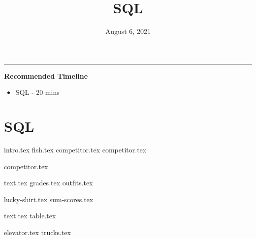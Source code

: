 \documentclass{exam}
\title{\textsc{SQL}}
\date{August 6, 2021}
\begin{document}
\maketitle\rule{\textwidth}{0.15em}
\fontsize{12}{15}\selectfont

\begin{blocksection}
\begin{guide}
\textbf{Recommended Timeline}
\begin{itemize}
  \item SQL - 20 mins
\end{itemize}
\end{guide}
\end{blocksection}


\section{SQL}
{intro.tex}
{fish.tex}
{competitor.tex}
{competitor.tex}

\begin{questions}
{competitor.tex}
\end{questions}
\newpage

{text.tex}
{grades.tex}
{outfits.tex}

\begin{questions}
{lucky-shirt.tex}
{sum-scores.tex}
\end{questions}

\newpage
{text.tex}
{table.tex}
\begin{questions}
{elevator.tex}
{trucks.tex}
\end{questions}
\end{document}
